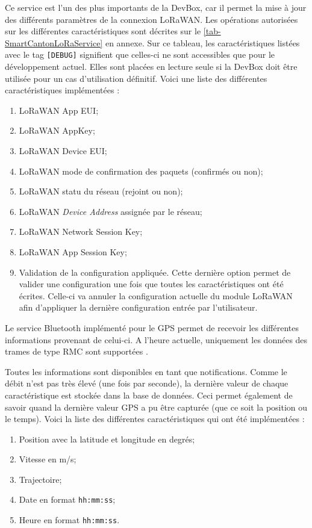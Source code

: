 Ce service est l'un des plus importants de la DevBox, car il permet la mise à jour des différents paramètres de la connexion LoRaWAN. Les opérations autorisées sur les différentes caractéristiques sont décrites sur le \cref{tab-SmartCantonLoRaService} en annexe. Sur ce tableau, les caractéristiques listées avec le tag \texttt{[DEBUG]} signifient que celles-ci ne sont accessibles que pour le développement actuel. Elles sont placées en lecture seule si la DevBox doit être utilisée pour un cas d'utilisation définitif. Voici une liste des différentes caractéristiques implémentées : 
\begin{enumerate}
    \item LoRaWAN App EUI;
    \item LoRaWAN AppKey; 
    \item LoRaWAN Device EUI;
    \item LoRaWAN mode de confirmation des paquets (confirmés ou non);
    \item LoRaWAN statu du réseau (rejoint ou non);
    \item LoRaWAN \textit{Device Address} assignée par le réseau;
    \item LoRaWAN Network Session Key;
    \item LoRaWAN App Session Key;
    \item Validation de la configuration appliquée. Cette dernière option permet de valider une configuration une fois que toutes les caractéristiques ont été écrites. Celle-ci va annuler la configuration actuelle du module LoRaWAN afin d'appliquer la dernière configuration entrée par l'utilisateur.  
\end{enumerate}


\FloatBarrier
{}

Le service Bluetooth implémenté pour le GPS permet de recevoir les différentes informations provenant de celui-ci. A l'heure actuelle, uniquement les données des trames de type RMC sont supportées \cite{NMEAdata3:online}. 

Toutes les informations sont disponibles en tant que notifications. Comme le débit n'est pas très élevé (une fois par seconde), la dernière valeur de chaque caractéristique est stockée dans la base de données. Ceci permet également de savoir quand la dernière valeur GPS a pu être capturée (que ce soit la position ou le temps). Voici la liste des différentes caractéristiques qui ont été implémentées : 
\begin{enumerate}
    \item Position avec la latitude et longitude en degrés;
    \item Vitesse en m/s;
    \item Trajectoire;
    \item Date en format \texttt{hh:mm:ss};
    \item Heure en format \texttt{hh:mm:ss}.
\end{enumerate}

